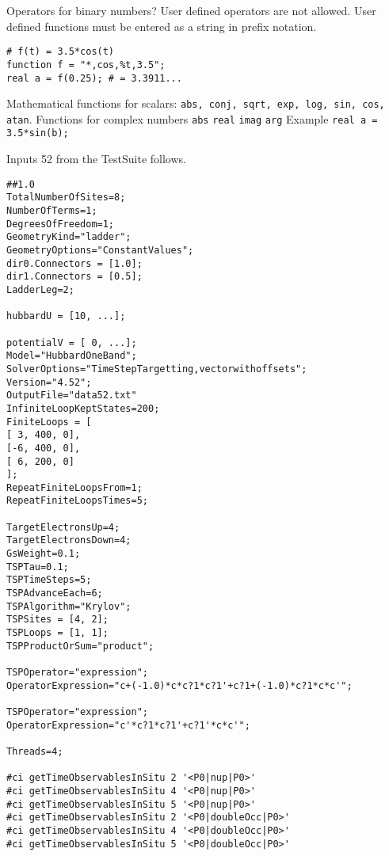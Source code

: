 \documentclass[twocolumn]{article}
\begin{document}
Operators for binary numbers? User defined operators are not allowed.
User defined functions must be entered as a string in prefix notation.
\begin{verbatim}
# f(t) = 3.5*cos(t)
function f = "*,cos,%t,3.5";
real a = f(0.25); # = 3.3911...
\end{verbatim}
Mathematical functions for scalars:
\texttt{abs, conj, sqrt, exp, log, sin, cos, atan}.
Functions for complex numbers \verb!abs! \verb!real! \verb!imag! \verb!arg! 
Example \texttt{real a = 3.5*sin(b);}

Inputs 52 from the TestSuite follows.
\begin{tiny}
\begin{verbatim}
##1.0
TotalNumberOfSites=8;
NumberOfTerms=1;
DegreesOfFreedom=1;
GeometryKind="ladder";
GeometryOptions="ConstantValues";
dir0.Connectors = [1.0];
dir1.Connectors = [0.5];
LadderLeg=2;

hubbardU = [10, ...];

potentialV = [ 0, ...];
Model="HubbardOneBand";
SolverOptions="TimeStepTargetting,vectorwithoffsets";
Version="4.52";
OutputFile="data52.txt"
InfiniteLoopKeptStates=200;
FiniteLoops = [
[ 3, 400, 0],
[-6, 400, 0],
[ 6, 200, 0]
];
RepeatFiniteLoopsFrom=1;
RepeatFiniteLoopsTimes=5;

TargetElectronsUp=4;
TargetElectronsDown=4;
GsWeight=0.1;
TSPTau=0.1;
TSPTimeSteps=5;
TSPAdvanceEach=6;
TSPAlgorithm="Krylov";
TSPSites = [4, 2];
TSPLoops = [1, 1];
TSPProductOrSum="product";

TSPOperator="expression";
OperatorExpression="c+(-1.0)*c*c?1*c?1'+c?1+(-1.0)*c?1*c*c'";

TSPOperator="expression";
OperatorExpression="c'*c?1*c?1'+c?1'*c*c'";

Threads=4;

#ci getTimeObservablesInSitu 2 '<P0|nup|P0>'
#ci getTimeObservablesInSitu 4 '<P0|nup|P0>'
#ci getTimeObservablesInSitu 5 '<P0|nup|P0>'
#ci getTimeObservablesInSitu 2 '<P0|doubleOcc|P0>'
#ci getTimeObservablesInSitu 4 '<P0|doubleOcc|P0>'
#ci getTimeObservablesInSitu 5 '<P0|doubleOcc|P0>'
\end{verbatim}
\end{tiny}
\end{document}
